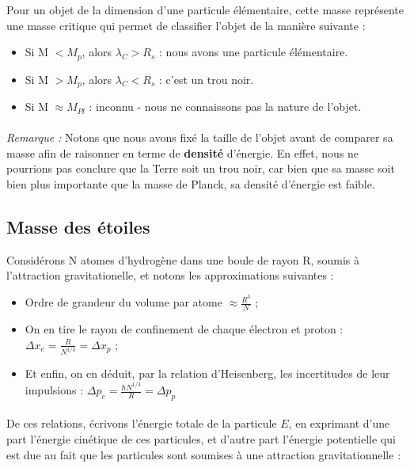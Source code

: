 \documentclass[../Notes de cours]{subfiles}
\begin{document}
Pour un objet de la dimension d'une particule élémentaire, cette masse représente une masse critique qui permet de classifier l'objet de la manière suivante : 
\begin{itemize}
\item Si M $< M_{p}$, alors $\lambda_C > R_s$ : nous avons une particule élémentaire.
\item Si M $> M_{p}$, alors $\lambda_C < R_s$ : c'est un trou noir.
\item Si M $\approx M_{Pl}$ : inconnu - nous ne connaissons pas la nature de l'objet.
\end{itemize}

\paragraph{} \textit{Remarque :} Notons que nous avons fixé la taille de l'objet avant de comparer sa masse afin de raisonner en terme de \textbf{densité} d'énergie. 
En effet, nous ne pourrions pas conclure que la Terre soit un trou noir, car bien que sa masse soit bien plus importante que la masse de Planck, sa densité d'énergie est faible.

\subsection{Masse des étoiles}
Considérons N atomes d'hydrogène dans une boule de rayon R, soumis à l'attraction gravitationelle, et notons les approximations suivantes : 
\begin{itemize}[label = \textbullet]
    \item Ordre de grandeur du volume par atome $\approx \frac{R^3}{N}$ ;
    \item On en tire le rayon de confinement de chaque électron et proton : $\Delta x_e = \frac{R}{N^{1/3}} = \Delta x_p$ ; 
    \item Et enfin, on en déduit, par la relation d'Heisenberg, les incertitudes de leur impulsions : $\Delta p_e = \frac{\hbar N^{1/3}}{R} = \Delta p_p$
\end{itemize} 

\paragraph{} De ces relations, écrivons l'énergie totale de la particule $E$, en exprimant d'une part l'énergie cinétique de ces particules, et d'autre part l'énergie potentielle qui est due au fait que les particules sont soumises à une attraction gravitationnelle : \\
\end{document}
